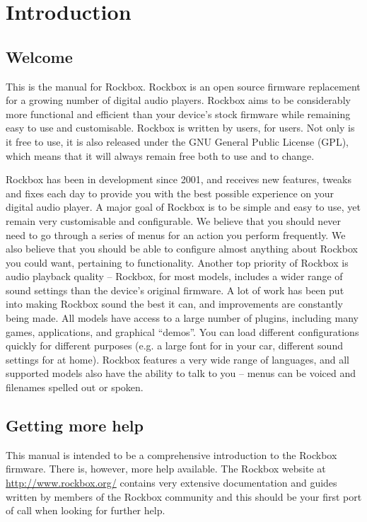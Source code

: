 \chapter{Introduction}
\section{Welcome}
This is the manual for Rockbox. Rockbox is an open source firmware replacement
for a growing number of digital audio players. Rockbox aims to be considerably
more functional and efficient than your device's stock firmware while remaining
easy to use and customisable. Rockbox is written by users, for users. Not only
is it free to use, it is also released under the GNU General Public License
(GPL), which means that it will always remain free both to use and to change.

Rockbox has been in development since 2001, and receives new features, tweaks
and fixes each day to provide you with the best possible experience on your
digital audio player. A major goal of Rockbox is to be simple and easy to use,
yet remain very customisable and configurable. We believe that you should never
need to go through a series of menus for an action you perform frequently. We
also believe that you should be able to configure almost anything about Rockbox
you could want, pertaining to functionality. Another top priority of Rockbox is
audio playback quality -- Rockbox, for most models, includes a wider range of
sound settings than the device's original firmware. A lot of work has been put
into making Rockbox sound the best it can, and improvements are constantly being
made. All models have access to a large number of plugins, including many games,
applications, and graphical ``demos''. You can load different configurations
quickly for different purposes (e.g. a large font for in your car, different
sound settings for at home). Rockbox features a very wide range of languages, and
all supported models also have the ability to talk to you -- menus can be voiced
and filenames spelled out or spoken.

\section{Getting more help}
This manual is intended to be a comprehensive introduction to the Rockbox
firmware. There is, however, more help available. The Rockbox website at
\url{http://www.rockbox.org/} contains very extensive documentation and guides
written by members of the Rockbox community and this should be your first port
of call when looking for further help.

